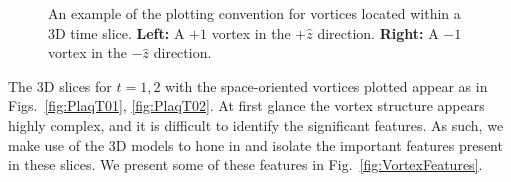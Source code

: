 \begin{figure}[ht]
\centering
  \begin{subfigure}[b]{0.3\textwidth}
  \centering
  
  \end{subfigure}
  \hfill
  \begin{subfigure}[b]{0.55\textwidth}
  \centering
  
  \end{subfigure}             
  \caption{An example of the plotting convention for vortices located within a 3D time slice. \textbf{Left:} A $+1$ vortex in the $+\hat{z}$ direction. \textbf{Right:} A $-1$ vortex in the $-\hat{z}$ direction.}
  \label{fig:SpacialVortices}
\end{figure}
%
The 3D slices for $t=1,2$ with the space-oriented vortices plotted appear as in Figs.~\ref{fig:PlaqT01}, \ref{fig:PlaqT02}. At first glance the vortex structure appears highly complex, and it is difficult to identify the significant features. As such, we make use of the 3D models to hone in and isolate the important features present in these slices. We present some of these features in Fig.~\ref{fig:VortexFeatures}.\\

